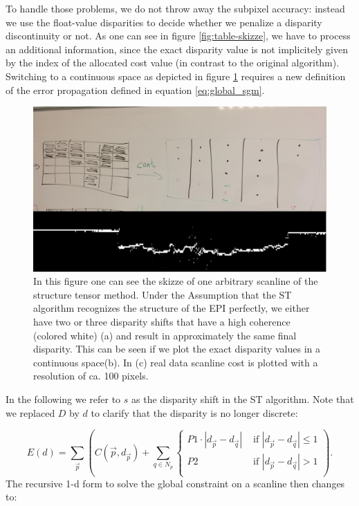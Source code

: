 \documentclass  [
  paper    = a4,
  BCOR     = 10mm,
  twoside,
  fontsize = 12pt,
  fleqn,
  toc      = bibnumbered,
  toc      = listofnumbered,
  numbers  = noendperiod,
  headings = normal,
  listof   = leveldown,
  version  = 3.03
]                                       {scrreprt}
\begin{document}
To handle those problems, we do not throw away the subpixel accuracy: instead we use the float-value disparities to decide whether we penalize a disparity discontinuity or not. As one can see in figure \ref{fig:table-skizze}, we have to process an additional information, since the exact disparity value is not implicitely given by the index of the allocated cost value (in contrast to the original algorithm). Switching to a continuous space as depicted in figure \ref{fig:discretecont} requires a new definition of the error propagation defined in equation \ref{eq:global_sgm}.
\begin{figure}
	\centering
	\includegraphics[width=0.7\linewidth]{images/discrete_cont}
	\caption[Discrete scanline to continuous scanline]{In this figure one can see the skizze of one arbitrary scanline of the structure tensor method. Under the Assumption that the ST algorithm recognizes the structure of the EPI perfectly, we either have two or three disparity shifts that have a high coherence (colored white) (a) and result in approximately the same final disparity. This can be seen if we plot the exact disparity values in a continuous space(b). In (c) real data scanline cost is plotted with a resolution of ca. 100 pixels.}
	\label{fig:discretecont}
\end{figure}


 In the following we refer to $s$ as the disparity shift in the ST algorithm. Note that we replaced $D$ by $d$ to clarify that the disparity is no longer discrete:

\begin{equation}\label{eq:global_sgm_cont}
E(d) = \sum_{\vec p} \left(C(\vec{p}, d_{\vec p}) + \sum_{q\in N_p} 
\begin{cases}
P1\cdot |d_{\vec p} - d_{\vec q}|  & \text{ if }|d_{\vec p} - d_{\vec q}| \leq 1\\
P2 & \text{ if }|d_{\vec p} - d_{\vec q}| > 1\\
\end{cases}  
\right).
\end{equation}
The recursive 1-d form to solve the global constraint on a scanline then changes to:
\end{document}
